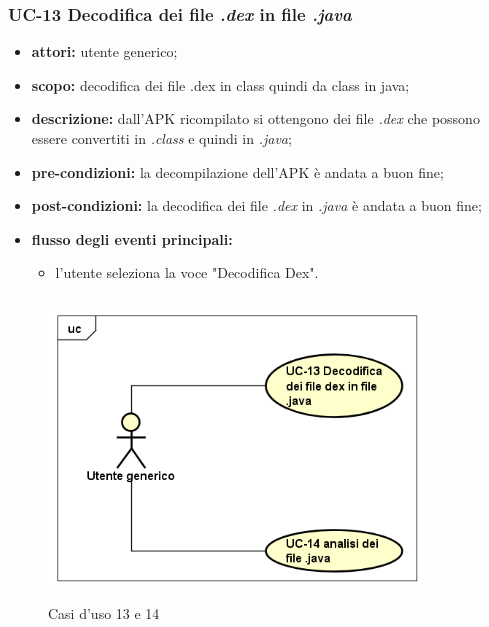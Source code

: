 \subsubsection{UC-13 Decodifica dei file \textit{.dex} in file \textit{.java}}\label{subsubsec:uc-13-decodifica-dei-filetextitin-filetextit}
\begin{itemize}
    \item \textbf{attori:} utente generico;
    \item \textbf{scopo:} decodifica dei file .dex in class quindi da class in java;
    \item \textbf{descrizione:} dall'APK ricompilato si ottengono dei file \textit{.dex} che possono essere convertiti in \textit{.class} e quindi in \textit{.java};
    \item \textbf{pre-condizioni:} la decompilazione dell'APK \`{e} andata a buon fine;
    \item \textbf{post-condizioni:} la decodifica dei file \textit{.dex} in \textit{.java} \`{e} andata a buon fine;
    \item \textbf{flusso degli eventi principali:}
    \begin{itemize}
        \item l'utente seleziona la voce "Decodifica Dex".
    \end{itemize}
\end{itemize}
\begin{figure}[!h]
    \centering
    \includegraphics[width=10cm, height=8cm]{./immagini/usecase/UC-13_14.png}
    \caption{Casi d'uso 13 e 14}
\end{figure}
